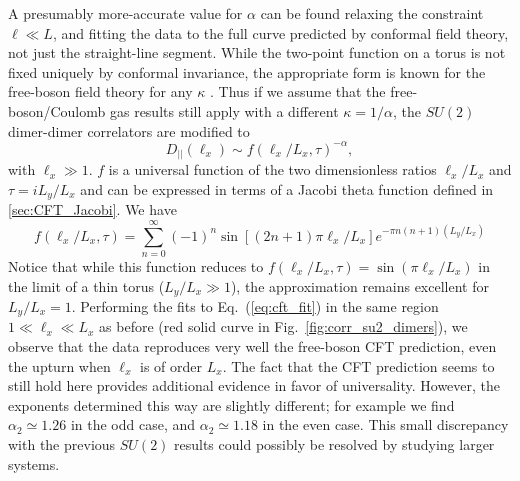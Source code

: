 \documentclass[11pt]{iopart}
\begin{document}
A presumably more-accurate value for $\alpha$ can be found relaxing the constraint $\ell \ll L$, and fitting the data to the full curve predicted by conformal field theory, not just the straight-line segment. While the two-point function on a torus is not fixed uniquely by conformal invariance, the appropriate form is known for the free-boson field theory for any $\kappa$ \cite{BigYellowBook}. Thus if we assume that the free-boson/Coulomb gas results still apply with a different $\kappa=1/\alpha$,  the $SU(2)$ dimer-dimer correlators are modified to 
\begin{equation}\label{eq:cft_fit}
 D_{||}(\ell_x)\sim f(\ell_x/L_x,\tau)^{-\alpha},
\end{equation}
with $\ell_x \gg 1$. $f$ is a universal function of the two dimensionless ratios $\ell_x/L_x$ and $\tau =i L_y/L_x$ and can be expressed in terms of a Jacobi theta function defined in \ref{sec:CFT_Jacobi}. We have 
\begin{equation}
 f(\ell_x/L_x,\tau)=\sum_{n=0}^{\infty}(-1)^n \sin \left[(2n+1)\pi \ell_x/L_x\right]e^{-\pi n(n+1)(L_y/L_x)}
\end{equation}
Notice that while this function reduces to $f(\ell_x/L_x,\tau)=\sin(\pi \ell_x/L_x)$ in the limit of a thin torus ($L_y/L_x \gg 1$), the approximation remains excellent for $L_y/L_x=1$. Performing the fits to Eq.~(\ref{eq:cft_fit}) in the same region $1\ll \ell_x \ll L_x$ as before (red solid curve in Fig.~\ref{fig:corr_su2_dimers}), we observe that the data reproduces very well the free-boson CFT prediction, even the upturn when $\ell_x$ is of order $L_x$. The fact that the CFT prediction seems to still hold here provides additional evidence in favor of universality. However, the exponents determined this way are slightly different; for example we find $\alpha_2\simeq 1.26$ in the odd case, and $\alpha_2\simeq 1.18$ in the even case. This small discrepancy with the previous $SU(2)$ results \cite{RVB1,RVB2} could possibly be resolved by studying larger systems.  
\end{document}
